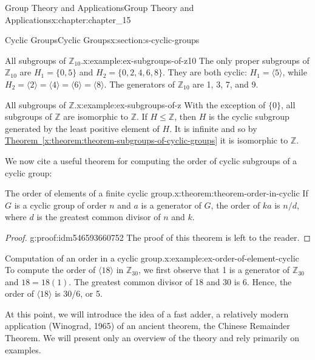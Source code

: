 \documentclass[oneside,10pt,]{book}
\newcommand{\xreffont}{\relax}
\numberwithin{equation}{section}
\begin{document}
\begin{chapterptx}{Group Theory and Applications}{}{Group Theory and Applications}{}{}{x:chapter:chapter_15}
\begin{sectionptx}{Cyclic Groups}{}{Cyclic Groups}{}{}{x:section:s-cyclic-groups}
\begin{example}{All subgroups of \(\mathbb{Z}_{10}\).}{x:example:ex-subgroups-of-z10}%
The only proper subgroups of \(\mathbb{Z}_{10}\) are \(H_1 = \{0, 5\}\) and \(H_2 = \{0, 2, 4, 6, 8\}\).  They are both cyclic: \(H_1= \langle 5 \rangle\), while \(H_2 = \langle 2 \rangle = \langle 4 \rangle = \langle 6 \rangle = \langle 8 \rangle\). The generators of \(\mathbb{Z}_{10}\) are 1, 3, 7, and 9.%
\end{example}
\begin{example}{All subgroups of \(\mathbb{Z}\).}{x:example:ex-subgroups-of-z}%
With the exception of \(\{0\}\), all subgroups of \(\mathbb{Z}\) are isomorphic to \(\mathbb{Z}\).  If \(H \leq  \mathbb{Z}\), then \(H\) is the cyclic subgroup generated by the least positive element of \(H\).  It is infinite and so by \hyperref[x:theorem:theorem-subgroups-of-cyclic-groups]{Theorem~{\xreffont\ref{x:theorem:theorem-subgroups-of-cyclic-groups}}} it is isomorphic to \(\mathbb{Z}\).%
\end{example}
We now cite a useful theorem for computing the order of cyclic subgroups of a cyclic group:%
\begin{theorem}{The order of elements of a finite cyclic group.}{}{x:theorem:theorem-order-in-cyclic}%
%
If \(G\) is a cyclic group of order \(n\) and \(a\) is a generator of \(G\), the order of \(k a\) is \(n/d\), where \(d\) is the greatest common divisor of \(n\) and \(k\).%
\end{theorem}
\begin{proof}{}{g:proof:idm546593660752}
The proof of this theorem is left to the reader.%
\end{proof}
\begin{example}{Computation of an order in a cyclic group.}{x:example:ex-order-of-element-cyclic}%
To compute the order of \(\langle 18 \rangle\) in \(\mathbb{Z}_{30}\), we first observe that 1 is a generator of \(\mathbb{Z}_{30}\)  and \(18= 18(1)\). The greatest common divisor of 18 and 30 is 6. Hence, the order of \(\langle 18 \rangle\) is 30\slash{}6, or 5.%
\end{example}
At this point, we will introduce the idea of a fast adder, a relatively modern application (Winograd, 1965) of an ancient theorem, the Chinese Remainder Theorem. We will present only an overview of the theory and rely primarily on examples.%
\par

\end{sectionptx}
\end{chapterptx}
\end{document}
